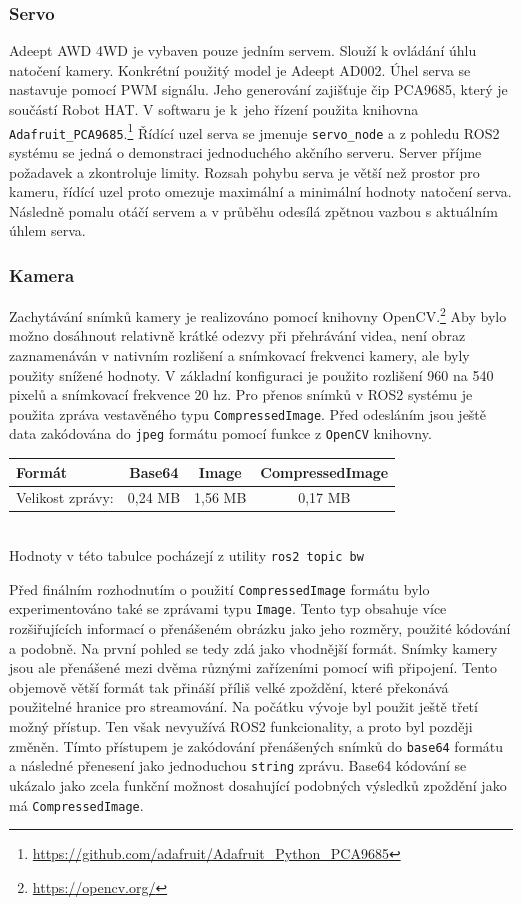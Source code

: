 \subsubsection*{Servo}
Adeept AWD 4WD je vybaven pouze jedním servem. Slouží k ovládání úhlu natočení kamery. Konkrétní použitý model je Adeept AD002. Úhel serva se nastavuje pomocí PWM signálu. Jeho generování zajišťuje čip PCA9685, který je součástí Robot HAT. V softwaru je k~jeho řízení použita knihovna \verb|Adafruit_PCA9685|.\footnote{\url{https://github.com/adafruit/Adafruit_Python_PCA9685}} Řídící uzel serva se jmenuje \verb|servo_node| a z pohledu ROS2 systému se jedná o demonstraci jednoduchého akčního serveru. Server příjme požadavek a zkontroluje limity. 
Rozsah pohybu serva je větší než prostor pro kameru, řídící uzel proto omezuje maximální a minimální hodnoty natočení serva. Následně pomalu otáčí servem a v průběhu odesílá zpětnou vazbou s aktuálním úhlem serva.

\subsubsection*{Kamera} \label{implementation:camera}
Zachytávání snímků kamery je realizováno pomocí knihovny OpenCV.\footnote{\url{https://opencv.org/}} Aby bylo možno dosáhnout relativně krátké odezvy při přehrávání videa, není obraz zaznamenáván v nativním rozlišení a snímkovací frekvenci kamery, ale byly použity snížené hodnoty. V základní konfiguraci je použito rozlišení 960 na 540 pixelů a snímkovací frekvence 20 hz.
Pro přenos snímků v ROS2 systému je použita zpráva vestavěného typu \verb|CompressedImage|. Před odesláním jsou ještě data zakódována do \verb|jpeg| formátu pomocí funkce z \verb|OpenCV| knihovny.

\begin{center}
	\begin{tabular}{| l | c c c |}
		\hline
		Formát & Base64 & Image & CompressedImage \\ 
		\hline
		Velikost zprávy: & 0,24 MB & 1,56 MB & 0,17 MB  \\ 
		\hline 
	\end{tabular} \\ \vspace*{0.5em}
	Hodnoty v této tabulce pocházejí z utility \verb|ros2 topic bw|
\end{center}

Před finálním rozhodnutím o použití \verb|CompressedImage| formátu bylo experimentováno také se zprávami typu \verb|Image|. Tento typ obsahuje více rozšiřujících informací o přenášeném obrázku jako jeho rozměry, použité kódování a podobně. Na první pohled se tedy zdá jako vhodnější formát. Snímky kamery jsou ale přenášené mezi dvěma různými zařízeními pomocí wifi připojení. Tento objemově větší formát tak přináší příliš velké zpoždění, které překonává použitelné hranice pro streamování. Na počátku vývoje byl použit ještě třetí možný přístup. Ten však nevyužívá ROS2 funkcionality, a proto byl později změněn. Tímto přístupem je zakódování přenášených snímků do \verb|base64| formátu a následné přenesení jako jednoduchou \verb|string| zprávu. Base64 kódování se ukázalo jako zcela funkční možnost dosahující podobných výsledků zpoždění jako má \verb|CompressedImage|.
 
